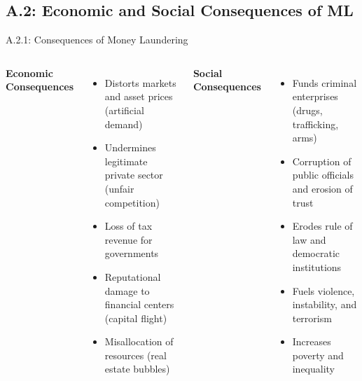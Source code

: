 \documentclass{beamer}
\begin{document}
	\subsection{A.2: Economic and Social Consequences of ML}
	
	\begin{frame}{A.2.1: Consequences of Money Laundering}
		\begin{columns}
			\textbf{Economic Consequences}
			\begin{itemize}
				\item Distorts markets and asset prices (artificial demand)
				\item Undermines legitimate private sector (unfair competition)
				\item Loss of tax revenue for governments
				\item Reputational damage to financial centers (capital flight)
				\item Misallocation of resources (real estate bubbles)
			\end{itemize}
			\textbf{Social Consequences}
			\begin{itemize}
				\item Funds criminal enterprises (drugs, trafficking, arms)
				\item Corruption of public officials and erosion of trust
				\item Erodes rule of law and democratic institutions
				\item Fuels violence, instability, and terrorism
				\item Increases poverty and inequality
			\end{itemize}
		\end{columns}
	\end{frame}
	
\end{document}

